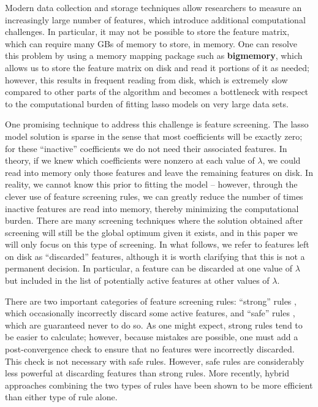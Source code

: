
Modern data collection and storage techniques allow researchers to measure an increasingly large number of features, which introduce additional computational challenges. In particular, it may not be possible to store the feature matrix, which can require many GBs of memory to store, in memory. One can resolve this problem by using a memory mapping package such as \textbf{bigmemory}, which allows us to store the feature matrix on disk and read it portions of it as needed; however, this results in frequent reading from disk, which is extremely slow compared to other parts of the algorithm and becomes a bottleneck with respect to the computational burden of fitting lasso models on very large data sets.

One promising technique to address this challenge is feature screening. The lasso model solution is sparse in the sense that most coefficients will be exactly zero; for these ``inactive'' coefficients we do not need their associated features.  In theory, if we knew which coefficients were nonzero at each value of $\lambda$, we could read into memory only those features and leave the remaining features on disk. In reality, we cannot know this prior to fitting the model -- however, through the clever use of feature screening rules, we can greatly reduce the number of times inactive features are read into memory, thereby minimizing the computational burden. There are many screening techniques where the solution obtained after screening will still be the global optimum given it exists, and in this paper we will only focus on this type of screening. In what follows, we refer to features left on disk as ``discarded'' features, although it is worth clarifying that this is not a permanent decision.  In particular, a feature can be discarded at one value of $\lambda$ but included in the list of potentially active features at other values of $\lambda$.

There are two important categories of feature screening rules: ``strong'' rules \citep{tibshirani2011regression, qian2019fast}, which occasionally incorrectly discard some active features, and ``safe'' rules \citep{ghaoui2010safe,wang2013lasso,xiang2012fast, xiang2011learning}, which are guaranteed never to do so.  As one might expect, strong rules tend to be easier to calculate; however, because mistakes are possible, one must add a post-convergence check to ensure that no features were incorrectly discarded. This check is not necessary with safe rules. However, safe rules are considerably less powerful at discarding features than strong rules. More recently, hybrid approaches  \citep{zeng2017efficient} combining the two types of rules have been shown to be more efficient than either type of rule alone.

